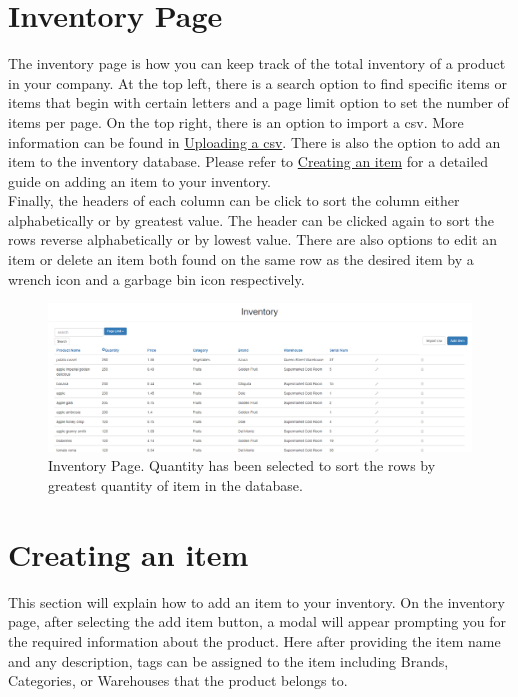 \documentclass[12pt, titlepage]{article}
\begin{document}
\section{Inventory Page}
The inventory page is how you can keep track of the total inventory of a product in your company. At the top left, there is a search option to find specific items or items that begin with certain letters and a page limit option to set the number of items per page. On the top right, there is an option to import a csv. More information can be found in \hyperref[sec:csv]{Uploading a csv}. There is also the option to add an item to the inventory database. Please refer to \hyperref[sec:createitem]{Creating an item} for a detailed guide on adding an item to your inventory.\\

Finally, the headers of each column can be click to sort the column either alphabetically or by greatest value. The header can be clicked again to sort the rows reverse alphabetically or by lowest value. There are also options to edit an item or delete an item both found on the same row as the desired item by a wrench icon and a garbage bin icon respectively.
\begin{figure}[h]
\centering
\includegraphics[width=\linewidth]{sims5.PNG}
\caption{Inventory Page. Quantity has been selected to sort the rows by greatest quantity of item in the database.}
\label{fig:figure4}
\end{figure}
\newpage

\section{Creating an item}
\label{sec:createitem}
This section will explain how to add an item to your inventory. On the inventory page, after selecting the add item button, a modal will appear prompting you for the required information about the product. Here after providing the item name and any description, tags can be assigned to the item including Brands, Categories, or Warehouses that the product belongs to. \\
\end{document}
